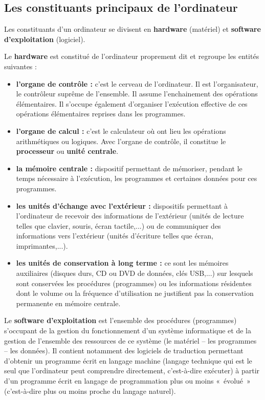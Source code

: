 	\subsection{Les constituants principaux de l’ordinateur}

		Les constituants d’un ordinateur se divisent en \textbf{hardware}
		(matériel) et \textbf{software d’exploitation} (logiciel).
		
		Le \textbf{hardware} est constitué de l’ordinateur proprement dit et
		regroupe les entités suivantes :

		\begin{itemize}
		\item
			\textbf{l’organe de contrôle :} c’est le cerveau de
			l'ordinateur. Il est l’organisateur, le contrôleur
			suprême de l’ensemble. Il assume l’enchainement des opérations
			élémentaires. Il s’occupe également d’organiser l’exécution effective
			de ces opérations élémentaires reprises dans les programmes.
		\item
			\textbf{l’organe de calcul :} c’est le calculateur où ont lieu les
			opérations arithmétiques ou logiques. Avec l’organe de contrôle, il
			constitue le \textbf{processeur} ou \textbf{unité centrale}.
		\item
			\textbf{la mémoire centrale :} dispositif permettant de mémoriser,
			pendant le temps nécessaire à l’exécution, les programmes et certaines
			données pour ces programmes.
		\item
			\textbf{les unités d’échange avec l’extérieur :} dispositifs permettant
			à l’ordinateur de recevoir des informations de l’extérieur (unités de
			lecture telles que clavier, souris, écran tactile,...) ou de
			communiquer des informations vers l’extérieur (unités d’écriture telles
			que écran, imprimantes,...).
		\item
			\textbf{les unités de conservation à long terme :} ce sont les mémoires
			auxiliaires (disques durs, CD ou DVD de données, clés USB,...) sur
			lesquels sont conservées les procédures (programmes) ou les
			informations résidentes dont le volume ou la fréquence d’utilisation ne
			justifient pas la conservation permanente en mémoire centrale.
		\end{itemize}
		
		Le \textbf{software d’exploitation} est l’ensemble des procédures
		(programmes) s’occupant de la gestion du fonctionnement d’un système
		informatique et de la gestion de l’ensemble des ressources de ce
		système (le matériel – les programmes – les données). Il contient
		notamment des logiciels de traduction permettant d’obtenir un programme
		écrit en langage machine (langage technique qui est le seul que
		l’ordinateur peut comprendre directement, c’est-à-dire exécuter) à
		partir d’un programme écrit en langage de programmation plus ou moins
		«~évolué~» (c’est-à-dire plus ou moins proche du langage naturel).

